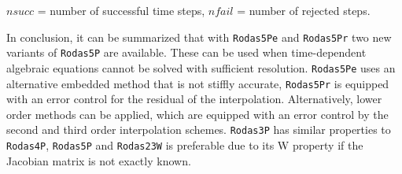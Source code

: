 \documentclass{juliacon}
\begin{document}
\begin{table} \label{tab:battery}
\begin{tabnote}
$nsucc$ = number of successful time steps, 
 $nfail$ = number of rejected steps.
 \end{tabnote}
\end{table}

In conclusion, it can be summarized that with \verb|Rodas5Pe| and \verb|Rodas5Pr| two new variants of \verb|Rodas5P| are available. 
These can be used when time-dependent algebraic equations cannot be solved with sufficient resolution.
\verb|Rodas5Pe| uses an alternative embedded method that is not stiffly accurate, \verb|Rodas5Pr| is equipped with an error control for the residual of the interpolation. 
Alternatively, lower order methods can be applied, which are equipped with an error control by the second and third order interpolation schemes.
\verb|Rodas3P| has similar properties to \verb|Rodas4P|, \verb|Rodas5P| and \verb|Rodas23W| is preferable due to its W property if the Jacobian matrix is not exactly known.
\end{document}
